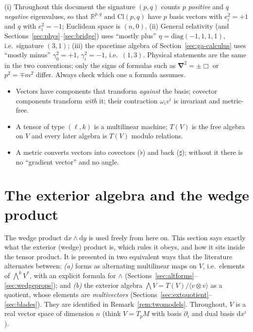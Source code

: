 \documentclass[11pt,a4paper]{article}
\numberwithin{equation}{section}
\theoremstyle{definition}
\theoremstyle{plain}
\newcommand{\R}{\mathbb{R}}
\newcommand{\dd}{\mathrm{d}}
\newcommand{\Cl}{\mathrm{Cl}}
\newcommand{\vd}{\boldsymbol{\nabla}}               %
\begin{document}
\begin{pitfall}
(i) Throughout this document the signature $(p,q)$ counts $p$ \emph{positive} and $q$ \emph{negative} eigenvalues,
so that $\R^{p,q}$ and $\Cl(p,q)$ have $p$ basis vectors with $e_i^2=+1$ and $q$ with $e_i^2=-1$; Euclidean space is $(n,0)$.
(ii) General relativity (and Sections~\ref{sec:phys}--\ref{sec:bridge}) uses ``mostly plus'' $\eta=\mathrm{diag}(-1,1,1,1)$, i.e.\ signature
$(3,1)$; (iii) the spacetime algebra of Section~\ref{sec:ga-calculus} uses ``mostly minus'' $\gamma_0^2=+1$, $\gamma_i^2=-1$, i.e.\ $(1,3)$.
Physical statements are the same in the two conventions; only the signs of formulas such as $\vd^2=\pm\Box$ or
$p^2=\mp m^2$ differ. Always check which one a formula assumes.
\end{pitfall}

\begin{keypoints}
\begin{itemize}
\item Vectors have components that transform \emph{against} the basis; covector components transform \emph{with} it; their contraction $\omega_iv^i$ is invariant and metric-free.
\item A tensor of type $(\ell,k)$ is a multilinear machine; $T(V)$ is the free algebra on $V$ and every later algebra is $T(V)$ modulo relations.
\item A metric converts vectors into covectors ($\flat$) and back ($\sharp$); without it there is no ``gradient vector'' and no angle.
\end{itemize}
\end{keypoints}


\section{The exterior algebra and the wedge product}\label{sec:ext}

The wedge product $\dd x\wedge\dd y$ is used freely from here on. This section says exactly what the exterior (wedge) product
is, which rules it obeys, and how it sits inside the tensor product. It is presented in two equivalent ways that the literature
alternates between: \emph{(a)} forms as alternating multilinear maps on $V$, i.e.\ elements of $\bigwedge^kV^*$, with an explicit
formula for $\wedge$ (Sections~\ref{sec:altforms}--\ref{sec:wedgeprops}); and \emph{(b)} the exterior algebra
$\bigwedge V=T(V)/\langle v\otimes v\rangle$ as a quotient, whose elements are \emph{multivectors}
(Sections~\ref{sec:extquotient}--\ref{sec:blades}). They are identified in Remark~\ref{rem:twomodels}. Throughout, $V$ is a real
vector space of dimension $n$ (think $V=T_pM$ with basis $\partial_i$ and dual basis $\dd x^i$).
\end{document}
